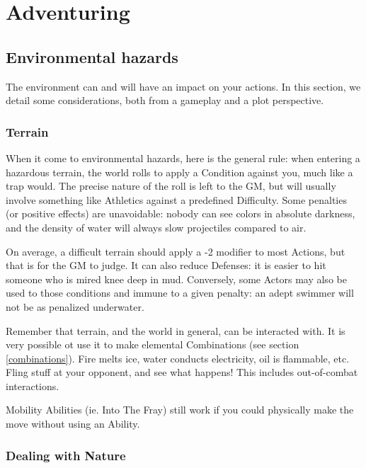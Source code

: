 
\chapter{Adventuring}

\section{Environmental hazards}

\label{hazards}


The environment can and will have an impact on your actions. In this section, we detail some considerations, both from a gameplay and a plot perspective.

\subsection{Terrain}

When it come to environmental hazards, here is the general rule: when entering a hazardous terrain, the world rolls to apply a Condition against you, much like a trap would. The precise nature of the roll is left to the GM, but will usually involve something like Athletics against a predefined Difficulty. Some penalties (or positive effects) are unavoidable: nobody can see colors in absolute darkness, and the density of water will always slow projectiles compared to air. 

On average, a difficult terrain should apply a -2 modifier to most Actions, but that is for the GM to judge. It can also reduce Defenses: it is easier to hit someone who is mired knee deep in mud. Conversely, some Actors may also be used to those conditions and immune to a given penalty: an adept swimmer will not be as penalized underwater.

Remember that terrain, and the world in general, can be interacted with. It is very possible ot use it to make elemental Combinations (see section \ref{combinations}). Fire melts ice, water conducts electricity, oil is flammable, etc. Fling stuff at your opponent, and see what happens! This includes out-of-combat interactions.

Mobility Abilities (ie. Into The Fray) still work if you could physically make the move without using an Ability.


\subsection{Dealing with Nature}

